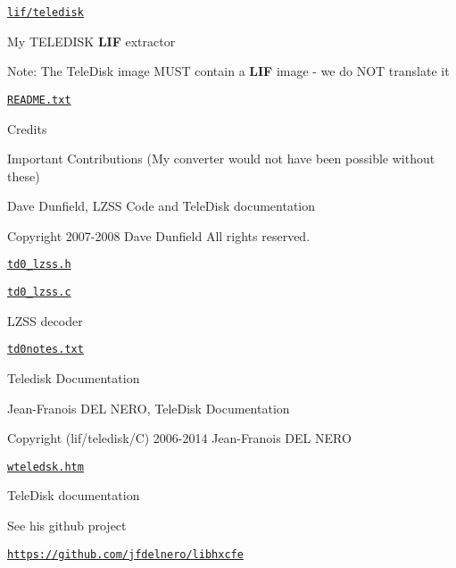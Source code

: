 \begin{DoxyItemize}
\item \href{lif/teledisk}{\tt lif/teledisk}
\begin{DoxyItemize}
\item My T\+E\+L\+E\+D\+I\+SK {\bfseries L\+IF} extractor
\begin{DoxyItemize}
\item Note\+: The Tele\+Disk image M\+U\+ST contain a {\bfseries L\+IF} image -\/ we do N\+OT translate it
\end{DoxyItemize}
\item \href{lif/teledisk/README.txt}{\tt R\+E\+A\+D\+M\+E.\+txt}
\begin{DoxyItemize}
\item Credits
\end{DoxyItemize}
\item Important Contributions (My converter would not have been possible without these)
\begin{DoxyItemize}
\item Dave Dunfield, L\+Z\+SS Code and Tele\+Disk documentation
\begin{DoxyItemize}
\item Copyright 2007-\/2008 Dave Dunfield All rights reserved.
\item \href{lif/teledisk/td0_lzss.h}{\tt td0\+\_\+lzss.\+h}
\item \href{lif/teledisk/td0_lzss.c}{\tt td0\+\_\+lzss.\+c}
\begin{DoxyItemize}
\item L\+Z\+SS decoder
\end{DoxyItemize}
\item \href{lif/teledisk/td0notes.txt}{\tt td0notes.\+txt}
\begin{DoxyItemize}
\item Teledisk Documentation
\end{DoxyItemize}
\end{DoxyItemize}
\item Jean-\/\+Franois D\+EL N\+E\+RO, Tele\+Disk Documentation
\begin{DoxyItemize}
\item Copyright (lif/teledisk/C) 2006-\/2014 Jean-\/\+Franois D\+EL N\+E\+RO
\begin{DoxyItemize}
\item \href{lif/teledisk/wteledsk.htm}{\tt wteledsk.\+htm}
\begin{DoxyItemize}
\item Tele\+Disk documentation
\end{DoxyItemize}
\item See his github project
\begin{DoxyItemize}
\item \href{https://github.com/jfdelnero/libhxcfe}{\tt https\+://github.\+com/jfdelnero/libhxcfe} 


\end{DoxyItemize}
\end{DoxyItemize}
\end{DoxyItemize}
\end{DoxyItemize}
\end{DoxyItemize}
\end{DoxyItemize}

